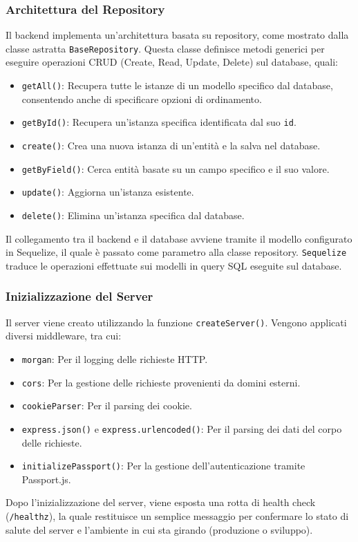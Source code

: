 \documentclass[twoside]{supsistudent}
\begin{document}
\subsubsection{Architettura del Repository}
Il backend implementa un'architettura basata su repository, come mostrato dalla classe astratta \texttt{BaseRepository}. Questa classe definisce metodi generici per eseguire operazioni CRUD (Create, Read, Update, Delete) sul database, quali:
\begin{itemize}
  \item \texttt{getAll()}: Recupera tutte le istanze di un modello specifico dal database, consentendo anche di specificare opzioni di ordinamento.
  \item \texttt{getById()}: Recupera un'istanza specifica identificata dal suo \texttt{id}.
  \item \texttt{create()}: Crea una nuova istanza di un'entità e la salva nel database.
  \item \texttt{getByField()}: Cerca entità basate su un campo specifico e il suo valore.
  \item \texttt{update()}: Aggiorna un'istanza esistente.
  \item \texttt{delete()}: Elimina un'istanza specifica dal database.
\end{itemize}
Il collegamento tra il backend e il database avviene tramite il modello configurato in Sequelize, il quale è passato come parametro alla classe repository. \texttt{Sequelize} traduce le operazioni effettuate sui modelli in query SQL eseguite sul database.


\subsubsection{Inizializzazione del Server}
Il server viene creato utilizzando la funzione \texttt{createServer()}. Vengono applicati diversi middleware, tra cui:
\begin{itemize}
  \item \texttt{morgan}: Per il logging delle richieste HTTP.
  \item \texttt{cors}: Per la gestione delle richieste provenienti da domini esterni.
  \item \texttt{cookieParser}: Per il parsing dei cookie.
  \item \texttt{express.json()} e \texttt{express.urlencoded()}: Per il parsing dei dati del corpo delle richieste.
  \item \texttt{initializePassport()}: Per la gestione dell'autenticazione tramite Passport.js.
\end{itemize}
Dopo l'inizializzazione del server, viene esposta una rotta di health check (\texttt{/healthz}), la quale restituisce un semplice messaggio per confermare lo stato di salute del server e l'ambiente in cui sta girando (produzione o sviluppo).
\end{document}
